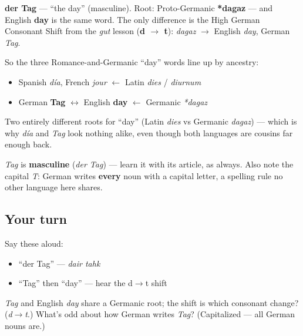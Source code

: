 \begin{cousinweb}
\textbf{der Tag} — \textquotedblleft{}the day\textquotedblright{} (masculine). Root: Proto-Germanic \textbf{*dagaz} — and English \textbf{day} is the same word. The only difference is the High German Consonant Shift from the \emph{gut} lesson (\textbf{d $\to$ t}): \emph{dagaz} $\to$ English \emph{day}, German \emph{Tag}.

So the three Romance-and-Germanic \textquotedblleft{}day\textquotedblright{} words line up by ancestry:

\begin{itemize}
\raggedright
  \item Spanish \emph{día}, French \emph{jour} $\leftarrow$ Latin \emph{dies} / \emph{diurnum}
  \item German \textbf{Tag} $\leftrightarrow$ English \textbf{day} $\leftarrow$ Germanic \emph{*dagaz}
\end{itemize}

Two entirely different roots for \textquotedblleft{}day\textquotedblright{} (Latin \emph{dies} vs Germanic \emph{dagaz}) — which is why \emph{día} and \emph{Tag} look nothing alike, even though both languages are cousins far enough back.
\end{cousinweb}

\begin{grammarlens}[title={Grammar Lens}]
\emph{Tag} is \textbf{masculine} (\emph{der Tag}) — learn it with its article, as always. Also note the capital \emph{T}: German writes \textbf{every} noun with a capital letter, a spelling rule no other language here shares.
\end{grammarlens}

\subsection*{Your turn}
Say these aloud:

\begin{itemize}
\raggedright
  \item \textquotedblleft{}der Tag\textquotedblright{} — \emph{dair tahk}
  \item \textquotedblleft{}Tag\textquotedblright{} then \textquotedblleft{}day\textquotedblright{} — hear the d$\to$t shift
\end{itemize}

\begin{tcolorbox}[breakable,colback=teal!4,colframe=teal!35!black,title={Before you move on}]
\emph{Tag} and English \emph{day} share a Germanic root; the shift is which consonant change? (\emph{d$\to$t}.) What's odd about how German writes \emph{Tag}? (Capitalized — all German nouns are.)
\end{tcolorbox}

